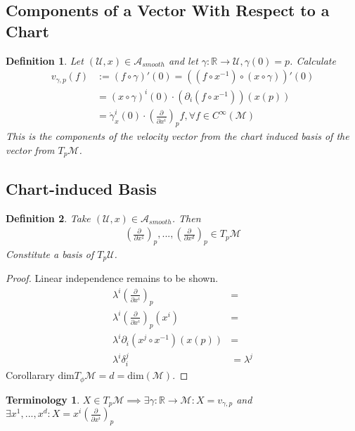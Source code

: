 \documentclass[10pt, oneside]{article}
\newcommand{\R}{\mathbb{R}}
\newcommand{\M}{\mathcal{M}}
\newtheorem{defn}{Definition}
\newtheorem{Terminology}{Terminology}
\begin{document}
  \subsection{Components of a Vector With Respect to a Chart}
  \begin{defn}
     Let $(\mathcal{U},x) \in \mathcal{A}_{smooth}$ and let $\gamma: \R \to \mathcal{U}, \gamma(0) =p$. Calculate
     \begin{align*}
        v_{\gamma,p}(f)&:= (f \circ \gamma)'(0) = ((f \circ x^{-1})\circ(x\circ \gamma))'(0) \\
        &= (x \circ \gamma)^i (0) \cdot(\partial_i(f \circ x^{-1}))(x(p)) \\
        &= \dot{\gamma}_x^i (0) \cdot(\frac{\partial}{\partial x^i})_p f, \forall f \in C^{\infty}(\M)
     \end{align*}
     This is the components of the velocity vector from the chart induced basis of the vector from $T_p \M$.
  \end{defn}
  \subsection{Chart-induced Basis}
  \begin{defn}
     Take $(\mathcal{U},x) \in \mathcal{A}_{smooth}$. Then
     \begin{align*}
        (\frac{\partial}{\partial x^1})_p, ..., (\frac{\partial}{\partial x^d})_p \in T_p \M
     \end{align*}
     Constitute a basis of $T_p \mathcal{U}$.
  \end{defn}
  \begin{proof}
     Linear independence remains to be shown.
     \begin{align*}
        \lambda^i (\frac{\partial}{\partial x^i})_p &=  \\
        \lambda^i (\frac{\partial}{\partial x^i})_p(x^i) &=\\
        \lambda^i \partial_i (x^j \circ x^{-1})(x(p)) &=  \\
        \lambda^i \delta_i^j &= \lambda^j
     \end{align*}
     Corollarary $\text{dim}T_\phi \M = d = \text{dim}(\M)$.
  \end{proof}
  \begin{Terminology}
     $X \in T_p \M \implies \exists \gamma: \R \to \M: X= v_{\gamma,p}$ and $\exists x^1, ..., x^d: X = x^i(\frac{\partial}{\partial x^i})_p$
  \end{Terminology}
\end{document}
